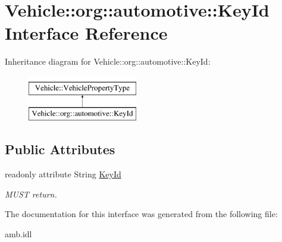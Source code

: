 \hypertarget{interfaceVehicle_1_1org_1_1automotive_1_1KeyId}{\section{Vehicle\-:\-:org\-:\-:automotive\-:\-:Key\-Id Interface Reference}
\label{interfaceVehicle_1_1org_1_1automotive_1_1KeyId}
}
Inheritance diagram for Vehicle\-:\-:org\-:\-:automotive\-:\-:Key\-Id\-:\begin{figure}[H]
\begin{center}
\leavevmode
\includegraphics[height=2.000000cm]{interfaceVehicle_1_1org_1_1automotive_1_1KeyId}
\end{center}
\end{figure}
\subsection*{Public Attributes}
\begin{DoxyCompactItemize}
\item 
\hypertarget{interfaceVehicle_1_1org_1_1automotive_1_1KeyId_a0483016607b3b039be725d20f2dde0d4}{readonly attribute String \hyperlink{interfaceVehicle_1_1org_1_1automotive_1_1KeyId_a0483016607b3b039be725d20f2dde0d4}{Key\-Id}}\label{interfaceVehicle_1_1org_1_1automotive_1_1KeyId_a0483016607b3b039be725d20f2dde0d4}

\begin{DoxyCompactList}\small\item\em M\-U\-S\-T return. \end{DoxyCompactList}\end{DoxyCompactItemize}


The documentation for this interface was generated from the following file\-:\begin{DoxyCompactItemize}
\item 
amb.\-idl\end{DoxyCompactItemize}
